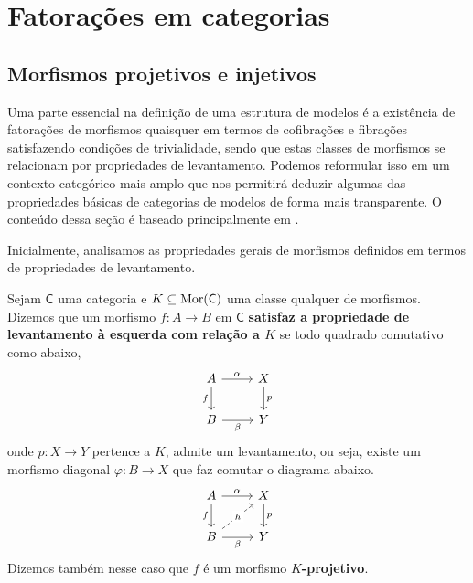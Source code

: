 \section{Fatorações em categorias}

\subsection{Morfismos projetivos e injetivos}

Uma parte essencial na definição de uma estrutura de modelos é a existência de fatorações de morfismos quaisquer em termos de cofibrações e fibrações satisfazendo condições de trivialidade, sendo que estas classes de morfismos se relacionam por propriedades de levantamento.
Podemos reformular isso em um contexto categórico mais amplo que nos permitirá deduzir algumas das propriedades básicas de categorias de modelos de forma mais transparente.
O conteúdo dessa seção é baseado principalmente em \cite{nlab:injective_or_projective_morphism}.

Inicialmente, analisamos as propriedades gerais de morfismos definidos em termos de propriedades de levantamento.

\begin{defin}\label{defin:morfismo_proj}
  Sejam $\mathsf{C}$ uma categoria e $K \subseteq \mathrm{Mor}(\mathsf{C})$ uma classe qualquer de morfismos.
  Dizemos que um morfismo $f: A \to B$ em $\mathsf{C}$ \textbf{satisfaz a propriedade de levantamento à esquerda com relação a $K$} se todo quadrado comutativo como abaixo,
  \begin{displaymath}
    \begin{tikzcd}
      A
      \arrow[r, "\alpha"]
      \arrow[d, "f" swap]
      & X
      \arrow[d, "p"]
      \\ B
      \arrow[r, "\beta" swap]
      & Y
    \end{tikzcd}
  \end{displaymath}
  onde $p: X \to Y$ pertence a $K$, admite um levantamento, ou seja, existe um morfismo diagonal $\varphi: B \to X$ que faz comutar o diagrama abaixo.
  \begin{displaymath}
    \begin{tikzcd}
      A
      \arrow[r, "\alpha"]
      \arrow[d, "f" swap]
      & X
      \arrow[d, "p"]
      \\ B
      \arrow[r, "\beta" swap]
      \arrow[ru, dashed, "h" description]
      & Y
    \end{tikzcd}
  \end{displaymath}
  Dizemos também nesse caso que $f$ é um morfismo \textbf{$K$-projetivo}.
\end{defin}

